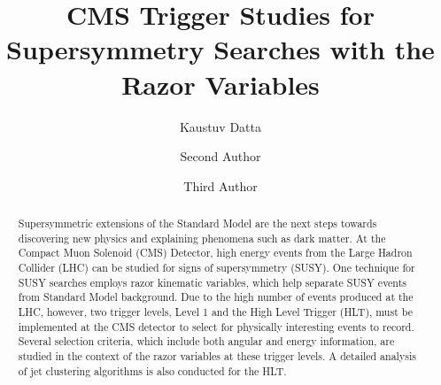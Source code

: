 \documentclass[twocolumn,aps,prd,reprint]{revtex4-1}
\begin{document}
\graphicspath{{KaustuvDatta/}}

\title{CMS Trigger Studies for Supersymmetry Searches with the Razor Variables}
\author{Kaustuv Datta}
\author{Second Author}
\author{Third Author}

\begin{abstract}
Supersymmetric extensions of the Standard Model are the next steps towards discovering new physics and explaining phenomena such as dark matter. At the Compact Muon Solenoid (CMS) Detector, high energy events from the Large Hadron Collider (LHC) can be studied for signs of supersymmetry (SUSY). One technique for SUSY searches employs razor kinematic variables, which help separate SUSY events from Standard Model background. Due to the high number of events produced at the LHC, however, two trigger levels, Level 1 and the High Level Trigger (HLT), must be implemented at the CMS detector to select for physically interesting events to record. Several selection criteria, which include both angular and energy information, are studied in the context of the razor variables at these trigger levels. A detailed analysis of jet clustering algorithms is also conducted for the HLT.
\end{abstract}
\maketitle
\end{document}
